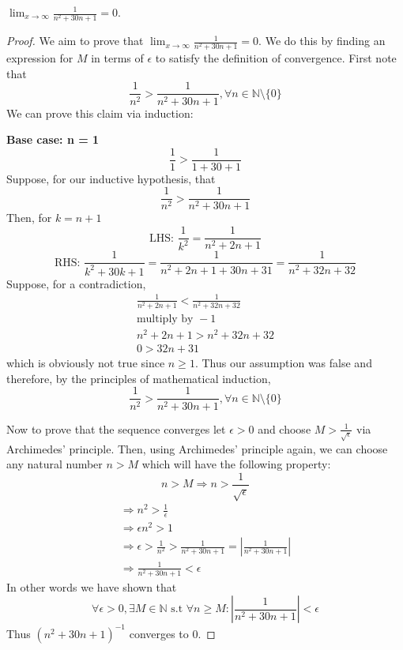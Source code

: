 \documentclass[12pt]{article}
\begin{document}
\noindent 
\(\displaystyle\lim_{x\to\infty} \frac{1}{n^2+30n+1} = 0\). 
\begin{proof}
    We aim to prove that \(\displaystyle\lim_{x\to\infty} \frac{1}{n^2 + 30n + 1} = 0\). 
    We do this by finding an expression for \(M\) in terms of \(\epsilon\) to satisfy 
    the definition of convergence. 
    First note that \[\frac{1}{n^2} > \frac{1}{n^2 + 30n + 1}, \forall n \in \mathbb N \setminus \{0\}\] 
    We can prove this claim via induction:
    
    \noindent 
    \textbf{Base case: n = 1} 
    \[ 
        \frac{1}{1} > \frac{1}{1+30+1}
    \]
    Suppose, for our inductive hypothesis, that  
    \[
        \frac{1}{n^2} > \frac{1}{n^2 + 30n + 1} 
    \]
    Then, for \(k = n+1\) 
    \[ 
        \text{LHS: }\frac{1}{k^2} = \frac{1}{n^2 + 2n + 1} 
    \]
    \[ 
        \text{RHS: }\frac{1}{k^2 + 30k + 1} = \frac{1}{n^2 + 2n + 1 + 30n + 31}
        = \frac{1}{n^2 + 32n + 32}
    \]
    Suppose, for a contradiction, 
    \begin{gather*}
        \frac{1}{n^2+2n+1} < \frac{1}{n^2 + 32n + 32} \\ 
        \text{multiply by } -1 \\ 
        n^2 + 2n + 1 > n^2 + 32n + 32 \\
        0 > 32n + 31 
    \end{gather*}
    which is obviously not true since \(n \geq 1\). 
    Thus our assumption was false and therefore, 
    by the principles of mathematical induction, 
    \[ 
        \frac{1}{n^2} > \frac{1}{n^2 +30n +1}, \forall n \in \mathbb N\setminus\{0\}
    \]
    
    \noindent 
    Now to prove that the sequence converges let \(\epsilon > 0\) and choose 
    \(M > \frac{1}{\sqrt{\epsilon}}\) via Archimedes' principle. 
    Then, using Archimedes' principle again, 
    we can choose any natural number \(n > M\) which will have the following property: 
    \[ 
        n > M \Rightarrow n > \frac{1}{\sqrt{\epsilon}}
    \]
    \begin{gather*}
        \Rightarrow n^2 > \frac{1}{\epsilon} \\ 
        \Rightarrow \epsilon n^2 > 1 \\ 
        \Rightarrow \epsilon > \frac{1}{n^2} > \frac{1}{n^2 + 30n + 1} 
        = |\frac{1}{n^2 + 30n + 1}| \\ 
        \Rightarrow \frac{1}{n^2 + 30n + 1} < \epsilon
    \end{gather*}
    In other words we have shown that 
    \[ 
        \forall \epsilon > 0,  \exists M \in \mathbb N \text{ s.t } \forall n \geq M : 
        |\frac{1}{n^2+30n+1}| < \epsilon
    \]
    Thus \((n^2 + 30n + 1)^{-1}\) converges to 0.  
\end{proof}
\end{document}
